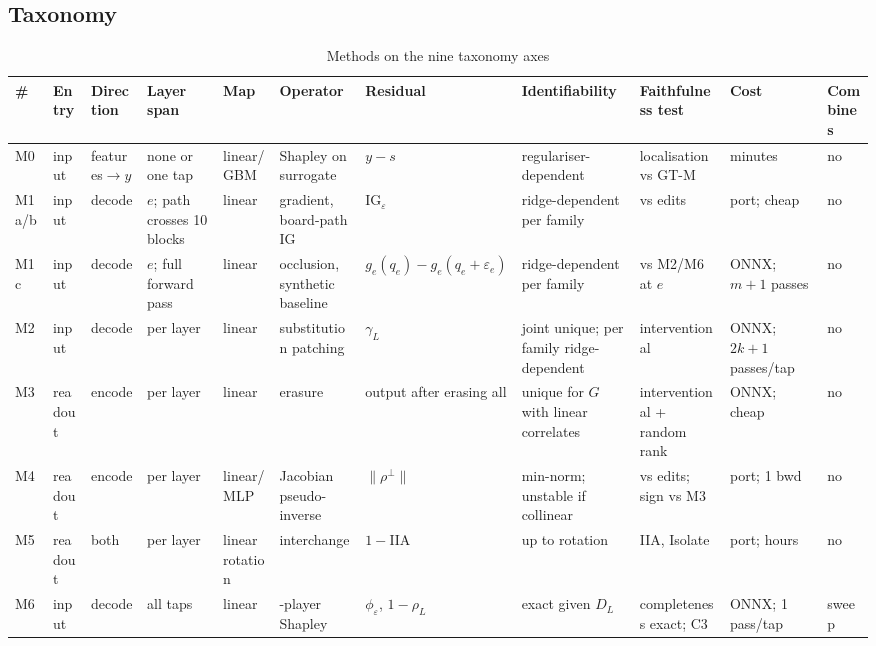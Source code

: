 \documentclass[conference]{IEEEtran}
\begin{document}
\begin{landscape}
\section{Taxonomy}\label{app:C}
\begin{table}[H]
\centering
\renewcommand{\thetable}{C1}
\caption{Methods on the nine taxonomy axes}
\label{tab:C1}
\scriptsize\setlength{\tabcolsep}{3pt}
\begin{tabularx}{\textwidth}{l>{\raggedright\arraybackslash}X>{\raggedright\arraybackslash}X>{\raggedright\arraybackslash}X>{\raggedright\arraybackslash}X>{\raggedright\arraybackslash}X>{\raggedright\arraybackslash}X>{\raggedright\arraybackslash}X>{\raggedright\arraybackslash}X>{\raggedright\arraybackslash}X>{\raggedright\arraybackslash}X}
\toprule
\# & Entry & Direction & Layer span & Map & Operator & Residual & Identifiability & Faithfulness test & Cost & Combines \\
\midrule
M0 & input & features$\to$\allowbreak{}$y$ & none or one tap & linear/\allowbreak{}GBM & Shapley on surrogate & $y-s$ & regulariser-dependent & localisation vs GT-M & minutes & no \\
M1a/\allowbreak{}b & input & decode & $e$; path crosses 10 blocks & linear & gradient, board-path IG & $\mathrm{IG}_\varepsilon$ & ridge-dependent per family & vs edits & port; cheap & no \\
M1c & input & decode & $e$; full forward pass & linear & occlusion, synthetic baseline & $g_e(q_e)-g_e(q_e+\varepsilon_e)$ & ridge-dependent per family & vs M2/\allowbreak{}M6 at $e$ & ONNX; $m{+}1$ passes & no \\
M2 & input & decode & per layer & linear & substitution patching & $\gamma_L$ & joint unique; per family ridge-dependent & interventional & ONNX; $2k{+}1$ passes/\allowbreak{}tap & no \\
M3 & readout & encode & per layer & linear & erasure & output after erasing all & unique for $G$ with linear correlates & interventional + random rank & ONNX; cheap & no \\
M4 & readout & encode & per layer & linear/\allowbreak{}MLP & Jacobian pseudo-inverse & $\|\rho^\perp\|$ & min-norm; unstable if collinear & vs edits; sign vs M3 & port; 1 bwd & no \\
M5 & readout & both & per layer & linear rotation & interchange & $1-$IIA & up to rotation & IIA, Isolate & port; hours & no \\
M6 & input & decode & all taps & linear & 2-player Shapley & $\phi_\varepsilon$, $1-\rho_L$ & exact given $D_L$ & completeness exact; C3 & ONNX; 1 pass/\allowbreak{}tap & sweep \\

\end{tabularx}
\end{table}
\end{landscape}
\end{document}
